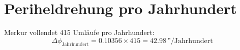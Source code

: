 \section{Periheldrehung pro Jahrhundert}
Merkur vollendet 415 Umläufe pro Jahrhundert:
\[
\Delta \phi_{\text{Jahrhundert}} = 0.10356 \times 415 = 42.98\, \text{''/Jahrhundert}
\]